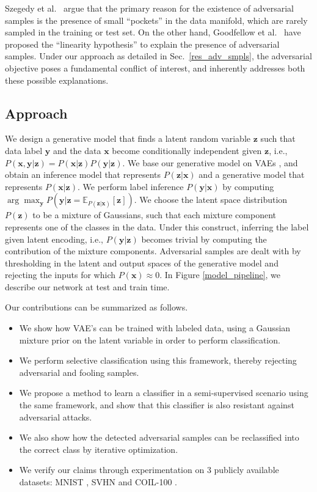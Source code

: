 \documentclass[letterpaper]{article} %
\begin{document}
Szegedy et al.~ argue that the primary reason for the existence of adversarial samples is the presence of small ``pockets'' in the data manifold, which are rarely sampled in the training or test set. On the other hand, Goodfellow et al.~ have proposed the ``linearity hypothesis'' to explain the presence of adversarial samples. Under our approach as detailed in Sec.~\ref{res_adv_smpls}, the adversarial objective poses a fundamental conflict of interest, and inherently addresses both these possible explanations.

\subsection{Approach} %
We design a generative model that finds a latent random variable $\mathbf{z}$ such that data label $\mathbf{y}$ and the data $\mathbf{x}$ become conditionally independent given $\mathbf{z}$, i.e., $P(\mathbf{x}, \mathbf{y} | \mathbf{z}) = P(\mathbf{x}|\mathbf{z})P(\mathbf{y}|\mathbf{z})$. We base our generative model on VAEs , and obtain an inference model that represents $P(\mathbf{z}|\mathbf{x})$ and a generative model that represents $P(\mathbf{x}|\mathbf{z})$. We perform label inference $P(\mathbf{y}|\mathbf{x})$ by computing $\arg\max_{\mathbf{y}} P(\mathbf{y}|\mathbf{z}= \mathbb{E}_{P(\mathbf{z}|\mathbf{x})}[\mathbf{z}])$. We choose the latent space distribution $P(\mathbf{z})$ to be a  mixture of Gaussians, such that each mixture component represents one of the classes in the data. Under this construct, inferring the label given latent encoding, i.e., $P(\mathbf{y}|\mathbf{z})$ becomes trivial by computing the contribution of the mixture components. Adversarial samples are dealt with by thresholding in the latent and output spaces of the generative model and rejecting the inputs for which $P(\mathbf{x}) \approx 0$. In Figure \ref{model_pipeline}, we describe our network at test and train time.

Our contributions can be summarized as follows.
\begin{itemize}
\item We show how VAE's can be trained with labeled data, using a Gaussian mixture prior on the latent variable in order to perform classification.
\item We perform selective classification using this framework, thereby rejecting adversarial and fooling samples.
\item We propose a method to learn a classifier in a semi-supervised scenario using the same framework, and show that this classifier is also resistant against adversarial attacks.
\item We also show how the detected adversarial samples can be reclassified into the correct class by iterative optimization.
\item We verify our claims through experimentation on 3 publicly available datasets: MNIST , SVHN  and COIL-100  .
\end{itemize}
\end{document}
